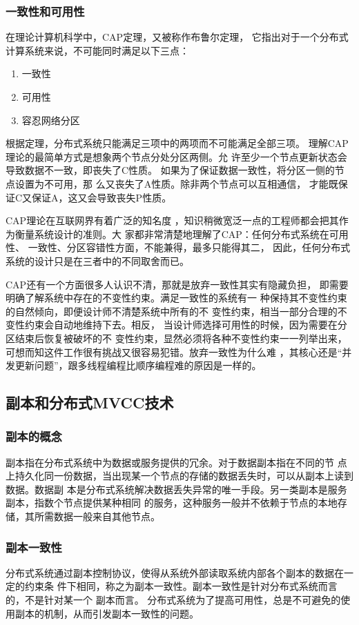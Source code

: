 \subsubsection{一致性和可用性}
在理论计算机科学中，CAP定理，又被称作布鲁尔定理，
它指出对于一个分布式计算系统来说，不可能同时满足以下三点：
\begin{enumerate}
	\item 一致性
	\item 可用性
	\item 容忍网络分区
\end{enumerate}
根据定理，分布式系统只能满足三项中的两项而不可能满足全部三项。
理解CAP理论的最简单方式是想象两个节点分处分区两侧。允
许至少一个节点更新状态会导致数据不一致，即丧失了C性质。
如果为了保证数据一致性，将分区一侧的节点设置为不可用，那
么又丧失了A性质。除非两个节点可以互相通信，
才能既保证C又保证A，这又会导致丧失P性质。

CAP理论在互联网界有着广泛的知名度
，知识稍微宽泛一点的工程师都会把其作为衡量系统设计的准则。大
家都非常清楚地理解了CAP：任何分布式系统在可用性、
一致性、分区容错性方面，不能兼得，最多只能得其二，
因此，任何分布式系统的设计只是在三者中的不同取舍而已。

CAP还有一个方面很多人认识不清，那就是放弃一致性其实有隐藏负担，
即需要明确了解系统中存在的不变性约束。满足一致性的系统有一
种保持其不变性约束的自然倾向，即便设计师不清楚系统中所有的不
变性约束，相当一部分合理的不变性约束会自动地维持下去。相反，
当设计师选择可用性的时候，因为需要在分区结束后恢复被破坏的不
变性约束，显然必须将各种不变性约束一一列举出来，
可想而知这件工作很有挑战又很容易犯错。放弃一致性为什么难
，其核心还是“并发更新问题”，跟多线程编程比顺序编程难的原因是一样的。
\subsection{副本和分布式MVCC技术}
\subsubsection{副本的概念}
副本指在分布式系统中为数据或服务提供的冗余。对于数据副本指在不同的节
点上持久化同一份数据，当出现某一个节点的存储的数据丢失时，可以从副本上读到数据。数据副
本是分布式系统解决数据丢失异常的唯一手段。另一类副本是服务副本，指数个节点提供某种相同
的服务，这种服务一般并不依赖于节点的本地存储，其所需数据一般来自其他节点。
\subsubsection{副本一致性}
分布式系统通过副本控制协议，使得从系统外部读取系统内部各个副本的数据在一定的约束条
件下相同，称之为副本一致性。副本一致性是针对分布式系统而言的，不是针对某一个
副本而言。
分布式系统为了提高可用性，总是不可避免的使用副本的机制，从而引发副本一致性的问题。
